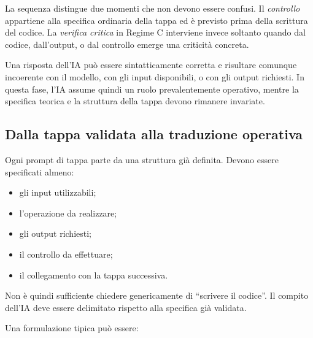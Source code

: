 La sequenza distingue due momenti che non devono essere confusi. Il
\emph{controllo} appartiene alla specifica ordinaria della tappa ed \`{e}
previsto prima della scrittura del codice. La \emph{verifica critica} in
Regime C interviene invece soltanto quando dal codice, dall'output, o dal
controllo emerge una criticit\`{a} concreta.

Una risposta dell'IA pu\`{o} essere sintatticamente corretta e risultare
comunque incoerente con il modello, con gli input disponibili, o con gli output
richiesti. In questa fase, l'IA assume quindi un ruolo prevalentemente
operativo, mentre la specifica teorica e la struttura della tappa devono
rimanere invariate.

\subsection{Dalla tappa validata alla traduzione operativa}

Ogni prompt di tappa parte da una struttura gi\`{a} definita. Devono essere
specificati almeno:

\begin{itemize}
\item gli input utilizzabili;

\item l'operazione da realizzare;

\item gli output richiesti;

\item il controllo da effettuare;

\item il collegamento con la tappa successiva.
\end{itemize}

Non \`{e} quindi sufficiente chiedere genericamente di ``scrivere il codice''.
Il compito dell'IA deve essere delimitato rispetto alla specifica gi\`{a}
validata.

Una formulazione tipica pu\`{o} essere:

\begin{quote}
\small
{}
\end{quote}

